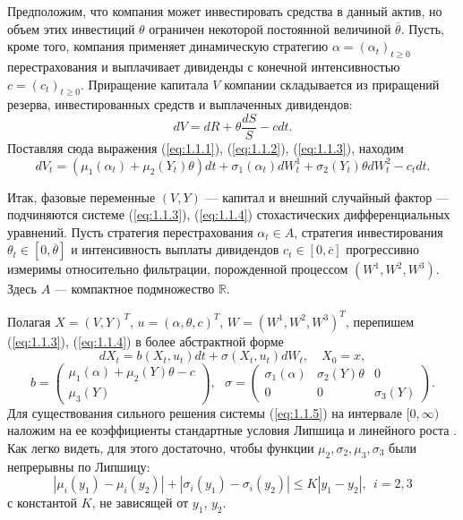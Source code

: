 Предположим, что компания может инвестировать средства в данный актив, но объем этих инвестиций $\theta$ ограничен некоторой постоянной величиной $\overline\theta$. Пусть, кроме того, компания применяет динамическую стратегию $\alpha=(\alpha_t)_{t\ge 0}$ перестрахования и выплачивает дивиденды с конечной интенсивностью $c=(c_t)_{t\ge 0}$.
Приращение капитала $V$ компании складывается из приращений резерва, инвестированных средств и выплаченных дивидендов:
$$dV=dR+\theta\frac{dS}{S}- cdt.$$
Поставляя сюда выражения (\ref{eq:1.1.1}), (\ref{eq:1.1.2}), (\ref{eq:1.1.3}), находим
\begin{equation} \label{eq:1.1.4}
dV_t=(\mu_1(\alpha_t)+\mu_2(Y_t) \theta)dt +\sigma_1(\alpha_t) d W_t^1+\sigma_2(Y_t) \theta d W_t^2-c_t dt.
\end{equation}

Итак, фазовые переменные $(V,Y)$ --- капитал и внешний случайный фактор --- подчиняются системе (\ref{eq:1.1.3}), (\ref{eq:1.1.4}) стохастических дифференциальных уравнений. Пусть стратегия перестрахования $\alpha_t\in A$, стратегия инвестирования $\theta_t\in [0,\overline\theta]$ и интенсивность выплаты дивидендов $c_t\in [0,\overline c]$ прогрессивно измеримы относительно фильтрации, порожденной процессом $(W^1,W^2,W^3)$. Здесь $A$ --- компактное подмножество $\mathbb R$.

Полагая $X=(V,Y)^T$, $u=(\alpha,\theta,c)^T$, $W=(W^1,W^2,W^3)^T$, перепишем (\ref{eq:1.1.3}), (\ref{eq:1.1.4}) в более абстрактной форме
\begin{equation} \label{eq:1.1.5}
dX_t=b(X_t,u_t)dt+\sigma(X_t,u_t)dW_t,\quad X_0=x,
\end{equation}
$$ b=\begin{pmatrix}
  \mu_1(\alpha)+\mu_2(Y) \theta-c \\
  \mu_3(Y)
 \end{pmatrix},\ \ \
\sigma=\begin{pmatrix}
  \sigma_1(\alpha) & \sigma_2(Y) \theta & 0\\
   0 & 0 & \sigma_3 (Y)
	\end{pmatrix}.
$$
Для существования сильного решения системы (\ref{eq:1.1.5}) на интервале $[0,\infty)$ наложим на ее коэффициенты стандартные условия Липшица и линейного роста \cite[гл.\,2, \S 5]{Kry77}. Как легко видеть, для этого достаточно, чтобы функции $\mu_2, \sigma_2, \mu_3, \sigma_3$ были непрерывны по Липшицу:
$$ |\mu_i(y_1)-\mu_i(y_2)|+|\sigma_i(y_1)-\sigma_i(y_2)|\le K|y_1-y_2|,\ \ i=2,3$$
с константой $K$, не зависящей от $y_1$, $y_2$.

